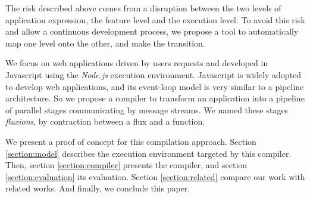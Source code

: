 The risk described above comes from a disruption between the two levels of application expression, the feature level and the execution level.
To avoid this risk and allow a continuous development process, we propose a tool to automatically map one level onto the other, and make the transition.

We focus on web applications driven by users requests and developed in Javascript using the \textit{Node.js} execution environment.
Javascript is widely adopted to develop web applications, and its event-loop model is very similar to a pipeline architecture.
So we propose a compiler to transform an application into a pipeline of parallel stages communicating by message streams.
We named these stages \textit{fluxions}, by contraction between a flux and a function.

We present a proof of concept for this compilation approach.
Section \ref{section:model} describes the execution environment targeted by this compiler.
Then, section \ref{section:compiler} presents the compiler, and section \ref{section:evaluation} its evaluation.
Section \ref{section:related} compare our work with related works.
And finally, we conclude this paper.